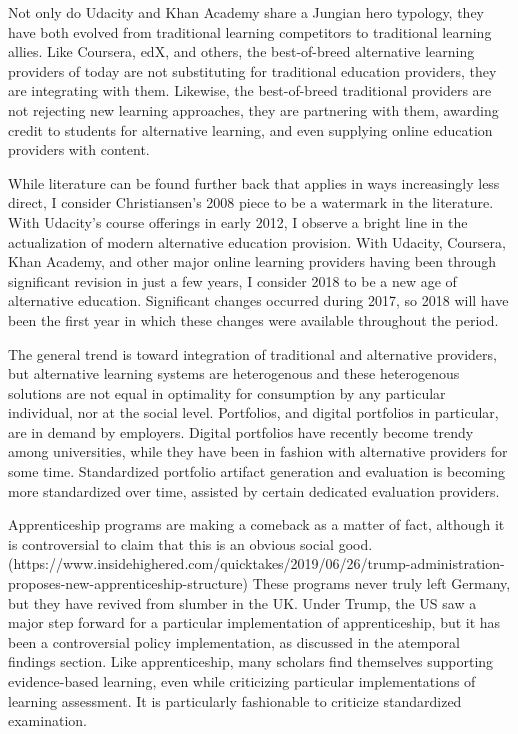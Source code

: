 \documentclass[AER]{/Users/zyl357/Documents/GitHub/research-dissertation-case-for-alt-ed/papers/alt-ed-survey/aea-latex-templates/AEA}
\begin{document}
Not only do Udacity and Khan Academy share a Jungian hero typology, they
have both evolved from traditional learning competitors to traditional
learning allies. Like Coursera, edX, and others, the best-of-breed
alternative learning providers of today are not substituting for
traditional education providers, they are integrating with them. Likewise,
the best-of-breed traditional providers are not rejecting new learning
approaches, they are partnering with them, awarding credit to students for
alternative learning, and even supplying online education providers with
content.

While literature can be found further back that applies in ways
increasingly less direct, I consider Christiansen's 2008 piece to be a
watermark in the literature. With Udacity's course offerings in early
2012, I observe a bright line in the actualization of modern alternative
education provision. With Udacity, Coursera, Khan Academy, and other major
online learning providers having been through significant revision in just
a few years, I consider 2018 to be a new age of alternative education.
Significant changes occurred during 2017, so 2018 will have been the first
year in which these changes were available throughout the period.

The general trend is toward integration of traditional and alternative
providers, but alternative learning systems are heterogenous and these
heterogenous solutions are not equal in optimality for consumption by any
particular individual, nor at the social level. Portfolios, and digital
portfolios in particular, are in demand by employers. Digital portfolios
have recently become trendy among universities, while they have been in
fashion with alternative providers for some time. Standardized portfolio
artifact generation and evaluation is becoming more standardized over
time, assisted by certain dedicated evaluation providers.

Apprenticeship programs are making a comeback as a matter of fact,
although it is controversial to claim that this is an obvious social good. (https://www.insidehighered.com/quicktakes/2019/06/26/trump-administration-proposes-new-apprenticeship-structure)
These programs never truly left Germany, but they have revived from
slumber in the UK. Under Trump, the US saw a major step forward for a
particular implementation of apprenticeship, but it has been a
controversial policy implementation, as discussed in the atemporal
findings section. Like apprenticeship, many scholars find themselves
supporting evidence-based learning, even while criticizing particular
implementations of learning assessment. It is particularly fashionable to
criticize standardized examination.
\end{document}
